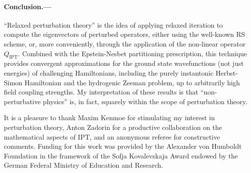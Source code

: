 \documentclass[aps,prl,reprint]{revtex4-2}
\begin{document}
	\paragraph{Conclusion.---} ``Relaxed perturbation theory'' is the idea of applying relaxed iteration to compute the eigenvectors of perturbed operators, either using the well-known RS scheme, or, more conveniently, through the application of the non-linear operator $Q_\textrm{IPT}$. Combined with the Epstein-Nesbet partitioning prescription, this technique provides convergent approximations for the ground state wavefunctions (not just energies) of challenging Hamiltonians, including the purely instantonic Herbst-Simon Hamiltonian and the hydrogenic Zeeman problem, up to arbitrarily high field coupling strengths. My interpretation of these results is that ``non-perturbative physics'' is, in fact, squarely within the scope of perturbation theory.

	\medskip
	       \begin{acknowledgments}
			It is a pleasure to thank Maxim Kenmoe for stimulating my interest in perturbation theory, Anton Zadorin for a productive collaboration on the mathematical aspects of IPT, and an anonymous referee for constructive comments. Funding for this work was provided by the Alexander von Humboldt Foundation in the framework of the Sofja Kovalevskaja Award endowed by the German Federal Ministry of Education and Research.
		\end{acknowledgments}



\end{document}
